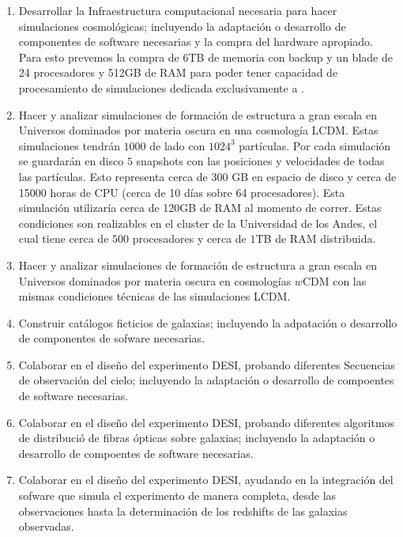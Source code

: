 \begin{enumerate}
\item Desarrollar la Infraestructura computacional necesaria para
  hacer simulaciones cosmol\'ogicas; incluyendo la adaptaci\'on o
  desarrollo de componentes de software necesarias y la compra del
  hardware apropiado. Para esto prevemos la compra de 6TB de memoria
  con backup y un blade de 24 procesadores y 512GB de RAM para poder
  tener capacidad de procesamiento de simulaciones dedicada
  exclusivamente a \coco.  

\item Hacer y analizar simulaciones de formaci\'on de estructura a
  gran escala en Universos dominados por materia oscura en una
  cosmolog\'ia LCDM. Estas simulaciones tendr\'an $1000$ \hMpc de lado
  con $1024^3$ part\'iculas. Por cada simulaci\'on se guardar\'an en
  disco $5$ snapshots con las posiciones y velocidades de todas las
  part\'iculas. Esto representa cerca de $300$ GB en espacio de disco
  y cerca de 15000 horas de CPU (cerca de 10 d\'ias sobre 64
  procesadores). Esta simulaci\'on utilizar\'ia cerca de 120GB de RAM
  al momento de correr. Estas condiciones son realizables en el
  cluster de la Universidad de los Andes, el cual tiene cerca de $500$
  procesadores y cerca de $1$TB de RAM distribuida.

\item Hacer y analizar simulaciones de formaci\'on de estructura a
  gran escala en Universos dominados por materia oscura en
  cosmolog\'ias $w$CDM con las mismas condiciones t\'ecnicas de las
  simulaciones LCDM. 

\item Construir cat\'alogos ficticios de galaxias; incluyendo la
  adpataci\'on o desarrollo de componentes de sofware necesarias.

\item Colaborar en el dise\~no del experimento DESI, probando
  diferentes Secuencias de observaci\'on del cielo;   incluyendo la
  adaptaci\'on o desarrollo de compoentes de software necesarias. 

\item Colaborar en el dise\~no del experimento DESI, probando
  diferentes algoritmos de distribuci\'o de fibras \'opticas sobre
  galaxias; incluyendo la adaptaci\'on o desarrollo de compoentes de
  software necesarias. 

\item Colaborar en el dise\~no del experimento DESI, ayudando en la
  integraci\'on del sofware que simula el experimento de manera
  completa, desde las observaciones hasta la determinaci\'on de los
  redshifts de las galaxias observadas.


\end{enumerate}
